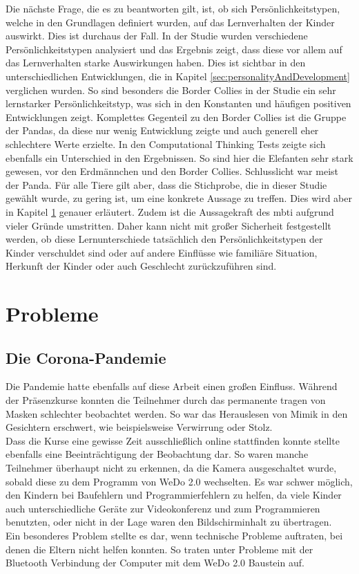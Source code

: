 Die nächste Frage, die es zu beantworten gilt, ist, ob sich Persönlichkeitstypen, welche in den Grundlagen definiert wurden, auf das Lernverhalten der Kinder auswirkt. Dies ist durchaus der Fall. In der Studie wurden verschiedene Persönlichkeitstypen analysiert und das Ergebnis zeigt, dass diese vor allem auf das Lernverhalten starke Auswirkungen haben. Dies ist sichtbar in den unterschiedlichen Entwicklungen, die in Kapitel \ref{sec:personalityAndDevelopment} verglichen wurden. So sind besonders die Border Collies in der Studie ein sehr lernstarker Persönlichkeitstyp, was sich in den Konstanten und häufigen positiven Entwicklungen zeigt. Komplettes Gegenteil zu den Border Collies ist die Gruppe der Pandas, da diese nur wenig Entwicklung zeigte und auch generell eher schlechtere Werte erzielte. In den Computational Thinking Tests zeigte sich ebenfalls ein Unterschied in den Ergebnissen. So sind hier die Elefanten sehr stark gewesen, vor den Erdmännchen und den Border Collies. Schlusslicht war meist der Panda. Für alle Tiere gilt aber, dass die Stichprobe, die in dieser Studie gewählt wurde, zu gering ist, um eine konkrete Aussage zu treffen. Dies wird aber in Kapitel \ref{sec:problems} genauer erläutert. Zudem ist die Aussagekraft des \acrlong{mbti} aufgrund vieler Gründe umstritten. Daher kann nicht mit großer Sicherheit festgestellt werden, ob diese Lernunterschiede tatsächlich den Persönlichkeitstypen der Kinder verschuldet sind oder auf andere Einflüsse wie familiäre Situation, Herkunft der Kinder oder auch Geschlecht zurückzuführen sind.


\section{Probleme}\label{sec:problems}
\subsection*{Die Corona-Pandemie}
Die Pandemie hatte ebenfalls auf diese Arbeit einen großen Einfluss. Während der Präsenzkurse konnten die Teilnehmer durch das permanente tragen von Masken schlechter beobachtet werden. So war das Herauslesen von Mimik in den Gesichtern erschwert, wie beispielsweise Verwirrung oder Stolz. \\
Dass die Kurse eine gewisse Zeit ausschließlich online stattfinden konnte stellte ebenfalls eine Beeinträchtigung der Beobachtung dar. So waren manche Teilnehmer überhaupt nicht zu erkennen, da die Kamera ausgeschaltet wurde, sobald diese zu dem Programm von WeDo 2.0 wechselten. Es war schwer möglich, den Kindern bei Baufehlern und Programmierfehlern zu helfen, da viele Kinder auch unterschiedliche Geräte zur Videokonferenz und zum Programmieren benutzten, oder nicht in der Lage waren den Bildschirminhalt zu übertragen.\\
Ein besonderes Problem stellte es dar, wenn technische Probleme auftraten, bei denen die Eltern nicht helfen konnten. So traten unter  Probleme mit der Bluetooth Verbindung der Computer mit dem WeDo 2.0 Baustein auf.

